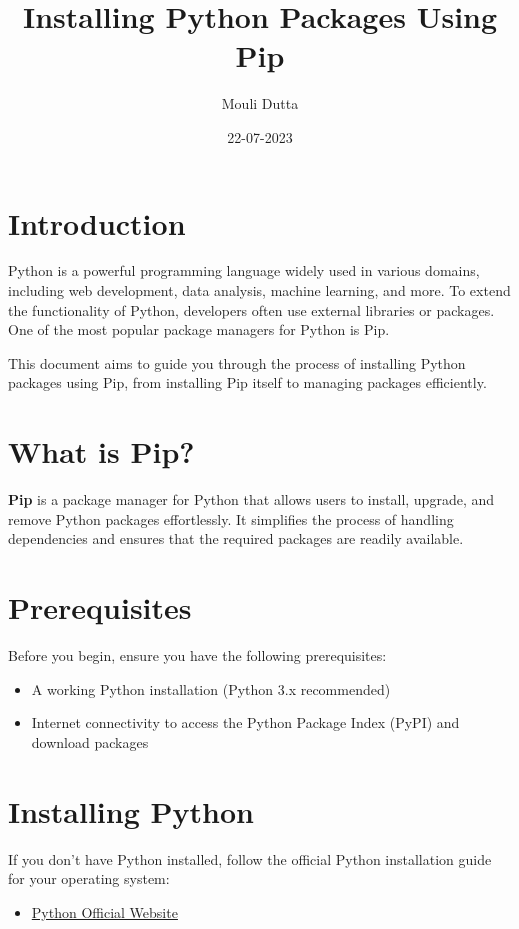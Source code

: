 \documentclass[a4paper, 12pt]{report}
\title{Installing Python Packages Using Pip}
\author{Mouli Dutta}
\date{22-07-2023}
\begin{document}
    \maketitle
    \tableofcontents
    \newpage

    \section{Introduction}
        Python is a powerful programming language widely used in various domains, including web development, data analysis, machine learning, and more. To extend the functionality of Python, developers often use external libraries or packages. One of the most popular package managers for Python is Pip.

        This document aims to guide you through the process of installing Python packages using Pip, from installing Pip itself to managing packages efficiently.

    
    \section{What is Pip?}
        \textbf{Pip} is a package manager for Python that allows users to install, upgrade, and remove Python packages effortlessly. It simplifies the process of handling dependencies and ensures that the required packages are readily available.

        
    \section{Prerequisites}
        Before you begin, ensure you have the following prerequisites:
        \begin{itemize}
            \item A working Python installation (Python 3.x recommended)
            \item Internet connectivity to access the Python Package Index (PyPI) and download packages
        \end{itemize}


    \section{Installing Python}
        If you don't have Python installed, follow the official Python installation guide for your operating system:
        \begin{itemize}
            \item \href{https://www.python.org/downloads/}{Python Official Website}
        \end{itemize}
\end{document}
